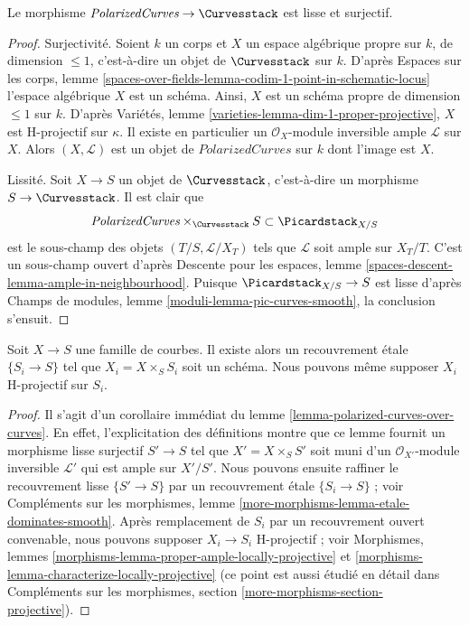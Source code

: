 \begin{lemma}
\label{lemma-polarized-curves-over-curves}
Le morphisme
$\textit{PolarizedCurves} \to \Curvesstack$
est lisse et surjectif.
\end{lemma}

\begin{proof}
Surjectivité. Soient $k$ un corps et $X$ un espace algébrique propre
sur $k$, de dimension $\leq 1$, c'est-à-dire un objet de $\Curvesstack$ sur $k$.
D'après Espaces sur les corps, lemme
\ref{spaces-over-fields-lemma-codim-1-point-in-schematic-locus}
l'espace algébrique $X$ est un schéma. Ainsi, $X$
est un schéma propre de dimension $\leq 1$ sur $k$.
D'après Variétés, lemme \ref{varieties-lemma-dim-1-proper-projective},
$X$ est H-projectif sur $\kappa$.
Il existe en particulier un $\mathcal{O}_X$-module inversible ample
$\mathcal{L}$ sur $X$. Alors $(X, \mathcal{L})$ est un objet
de $\textit{PolarizedCurves}$ sur
$k$ dont l'image est $X$.

\medskip\noindent
Lissité. Soit $X \to S$ un objet de $\Curvesstack$, c'est-à-dire un
morphisme $S \to \Curvesstack$. Il est clair que
$$
\textit{PolarizedCurves}
\times_{\Curvesstack} S
\subset \Picardstack_{X/S}
$$
est le sous-champ des objets $(T/S, \mathcal{L}/X_T)$ tels que
$\mathcal{L}$ soit ample sur $X_T/T$. C'est un sous-champ ouvert d'après
Descente pour les espaces, lemme \ref{spaces-descent-lemma-ample-in-neighbourhood}.
Puisque $\Picardstack_{X/S} \to S$ est lisse d'après
Champs de modules, lemme \ref{moduli-lemma-pic-curves-smooth},
la conclusion s'ensuit.
\end{proof}

\begin{lemma}
\label{lemma-etale-locally-scheme}
Soit $X \to S$ une famille de courbes.
Il existe alors un recouvrement étale $\{S_i \to S\}$
tel que $X_i = X \times_S S_i$ soit un schéma. Nous pouvons même
supposer $X_i$ H-projectif sur $S_i$.
\end{lemma}

\begin{proof}
Il s'agit d'un corollaire immédiat du
lemme \ref{lemma-polarized-curves-over-curves}.
En effet, l'explicitation des définitions montre que ce lemme fournit un
morphisme lisse surjectif $S' \to S$ tel que $X' = X \times_S S'$
soit muni d'un $\mathcal{O}_{X'}$-module inversible
$\mathcal{L}'$ qui est ample sur $X'/S'$.
Nous pouvons ensuite raffiner le recouvrement lisse $\{S' \to S\}$
par un recouvrement étale $\{S_i \to S\}$ ; voir
Compléments sur les morphismes, lemme \ref{more-morphisms-lemma-etale-dominates-smooth}.
Après remplacement de $S_i$ par un recouvrement ouvert convenable, nous
pouvons supposer $X_i \to S_i$ H-projectif ; voir
Morphismes, lemmes \ref{morphisms-lemma-proper-ample-locally-projective} et
\ref{morphisms-lemma-characterize-locally-projective}
(ce point est aussi étudié en détail dans
Compléments sur les morphismes, section \ref{more-morphisms-section-projective}).
\end{proof}






